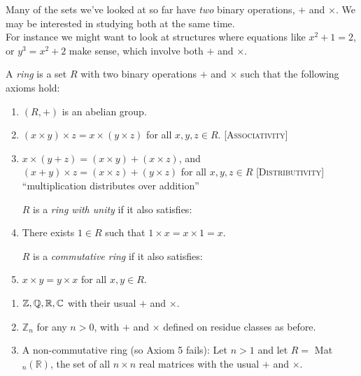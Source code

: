 
 Many  
of the sets we've looked at so far have \emph{two} binary operations, $+$ and $\times$. We may be interested in studying both at the same time.\\
 
 For instance we might want to look at structures where equations like $x^2 + 1 = 2$, or $y^3 = x^2 + 2$ make sense, which involve both $+$ and $\times$.\\
 
\begin{definition} A \emph{ring} is a set $R$ with two binary operations $+$ and $\times$ such that the following axioms hold:
 \begin{enumerate}
 \item $(R,+)$ is an abelian group.
 \item $(x \times y)\times z = x \times (y \times z)$ for all $x,y,z \in R$. \textsc{[Associativity]}
 \item $x \times (y + z) = (x \times y) + (x \times z)$, and $(x + y) \times z = (x \times z) + (y \times z)$ for all $x,y,z \in R$ \textsc{[Distributivity]} ``multiplication distributes over addition''\\ \vspace*{-10pt}
 
 $R$ is a \emph{ring with unity} if it also satisfies:\\  \vspace*{-12pt}

 \item  There exists $1 \in R$ such that $1 \times x = x \times 1 = x$. \\ \vspace*{-10pt}

$R$ is a \emph{commutative ring} if it also satisfies:\\ \vspace*{-12pt}
\item $x \times y = y \times x$ for all $x,y \in R$.\\ \vspace*{-10pt}

 \end{enumerate}
 \end{definition}\vspace*{10pt}
 
\begin{examples} \begin{enumerate}
 \item $\mathbb{Z}, \mathbb{Q}, \mathbb{R}, \mathbb{C}$ with their usual $+$ and $\times$.
 \item $\mathbb{Z}_n$ for any $n > 0$, with $+$ and $\times$ defined on residue classes as before.
 \item A non-commutative ring (so Axiom 5 fails): Let $n >1$ and let $R =$ Mat$_n(\mathbb{R})$, the set of all $n \times n$ real matrices with the usual $+$ and $\times$.	
 \end{enumerate}
 \end{examples}\vspace*{10pt}
 
